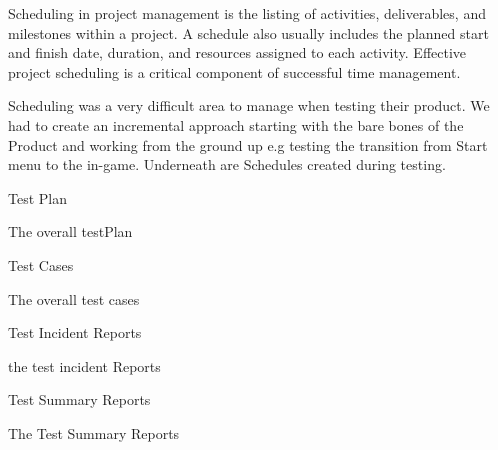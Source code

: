 Scheduling in project management is the listing of activities, deliverables, and milestones within a project. A schedule also usually includes the planned start and finish date, duration, and resources assigned to each activity. Effective project scheduling is a critical component of successful time management.

Scheduling was a very difficult area to manage when testing their product. We had to create an
incremental approach starting with the bare bones of the Product and working from the ground up
e.g testing the transition from Start menu to the in-game. Underneath are Schedules created during
testing.


\begin{center}
\centerline{Test Plan}
\end{center}
The overall testPlan



\begin{center}
\centerline{Test Cases}
\end{center}
The overall test cases


\begin{center}
\centerline{Test Incident Reports}
\end{center}
the test incident Reports



\begin{center}
\centerline{Test Summary Reports}
\end{center}
The Test Summary Reports
